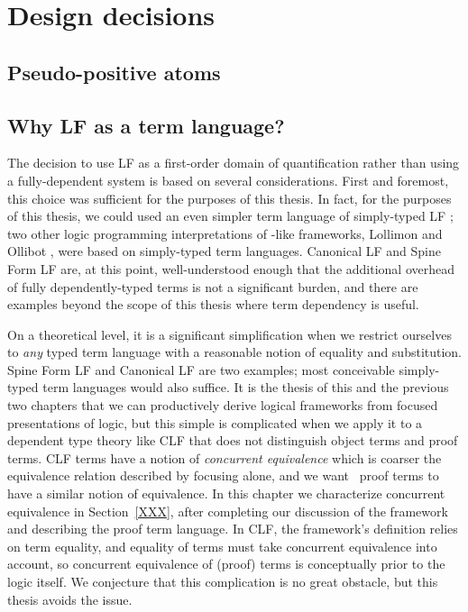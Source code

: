 \section{Design decisions}

\subsection{Pseudo-positive atoms}
\label{sec:pseudopositive}


\subsection{Why LF as a term language?}
\label{sec:why-not-fully-dependent}

The decision to use LF as a first-order domain of quantification
rather than using a fully-dependent system is based on several
considerations. First and foremost, this choice was sufficient for the
purposes of this thesis. In fact, for the purposes of this thesis, we
could used an even simpler term language of simply-typed LF
\cite{pfenning08church}; two other logic programming interpretations
of \sls-like frameworks, Lollimon \cite{lopez05monadic} and Ollibot
\cite{pfenning09substructural}, were based on simply-typed term
languages. Canonical LF and Spine Form LF are, at this point,
well-understood enough that the additional overhead of fully
dependently-typed terms is not a significant burden, and there are
examples beyond the scope of this thesis where term dependency is
useful.

On a theoretical level, it is a significant simplification when we
restrict ourselves to {\it any} typed term language with a reasonable
notion of equality and substitution. Spine Form LF and Canonical LF
are two examples; most conceivable simply-typed term languages would
also suffice. It is the thesis of this and the previous two chapters
that we can productively derive logical frameworks from focused
presentations of logic, but this simple is complicated when we apply it
to a dependent type theory like CLF that does not distinguish object
terms and proof terms. CLF terms have a notion of {\it concurrent
  equivalence} which is coarser the equivalence relation described by
focusing alone, and we want \sls~proof terms to have a similar notion
of equivalence. In this chapter we characterize concurrent equivalence
in Section~\ref{XXX}, after completing our discussion of the framework
and describing the proof term language.  In CLF, the framework's
definition relies on term equality, and equality of terms must take
concurrent equivalence into account, so concurrent equivalence of
(proof) terms is conceptually prior to the logic itself. We conjecture
that this complication is no great obstacle, but this thesis avoids
the issue.

